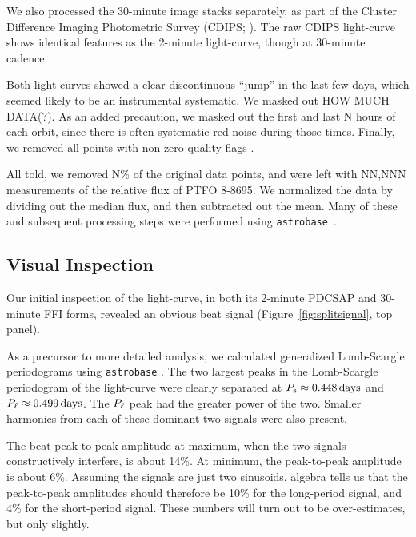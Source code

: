 \documentclass[12pt,twocolumn,tighten]{aastex62}
\begin{document}
We also processed the 30-minute image stacks separately, as part of
the Cluster Difference Imaging
Photometric Survey (CDIPS; \citep{bouma_cluster_2019}).
The raw CDIPS light-curve shows identical features as the 2-minute
light-curve, though at 30-minute cadence.

Both light-curves showed a clear discontinuous ``jump'' in the last
few days, which seemed likely to be an instrumental systematic.
We masked out HOW MUCH DATA(?).
As an added precaution, we masked out the first and last N hours
of each orbit, since there is often
systematic red noise during those times.
Finally, we removed all points with non-zero quality flags \citep[see][]{tess_data_product_description_2018}.

All told, we removed N\% of the original data points, and were left
with NN{,}NNN measurements of the relative flux of PTFO 8-8695.  We
normalized the data by dividing out the median flux, and then
subtracted out the mean.  Many of these and
subsequent processing steps were performed using
\texttt{astrobase}~\citep{bhatti_astrobase_2018}. 


\subsection{Visual Inspection}

Our initial inspection of the light-curve, in both its 2-minute PDCSAP
and 30-minute FFI forms, revealed an obvious beat signal
(Figure~\ref{fig:splitsignal}, top panel).

As a precursor to more detailed analysis, we calculated generalized
Lomb-Scargle periodograms using \texttt{astrobase}
\citep{lomb_1976,scargle_studies_1982,vanderplas_periodograms_2015,bhatti_astrobase_2018}.
The two largest peaks in the Lomb-Scargle periodogram of the
light-curve were clearly separated at $P_{\rm s} \approx 0.448\,{\rm
days}$ and $P_{\rm \ell} \approx 0.499\,{\rm days}$.  The $P_{\rm
\ell}$ peak had the greater power of the two.  Smaller harmonics from
each of these dominant two signals were also present.


The beat peak-to-peak amplitude at maximum, when the two signals
constructively interfere, is about 14\%.  At minimum, the peak-to-peak
amplitude is about 6\%.  Assuming the signals are just two sinusoids,
algebra tells us that the peak-to-peak amplitudes should therefore be
10\% for the long-period signal, and 4\% for the short-period signal.
These numbers will turn out to be over-estimates, but only slightly.
\end{document}
